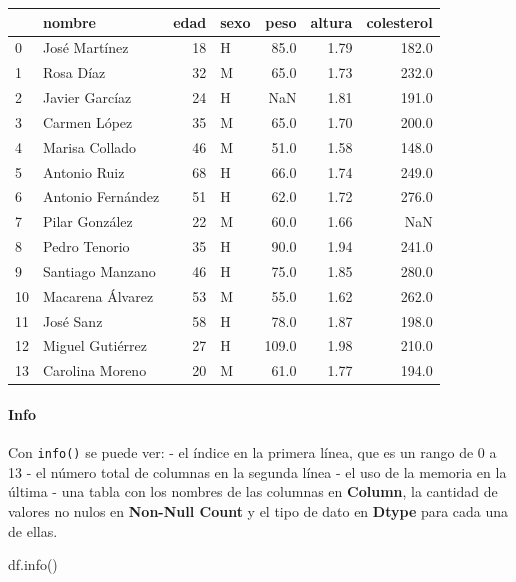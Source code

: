 \documentclass[
  letterpaper,
  DIV=11,
  numbers=noendperiod]{scrreprt}
\let\oldparagraph\paragraph
\renewcommand{\paragraph}[1]{\oldparagraph{#1}\mbox{}}
\newenvironment{Shaded}{\begin{snugshade}}{\end{snugshade}}
\newcommand{\NormalTok}[1]{\textcolor[rgb]{0.00,0.23,0.31}{#1}}
\begin{document}
\begin{tabular}{llrlrrr}
\toprule
{} &             nombre &  edad & sexo &   peso &  altura &  colesterol \\
\midrule
0  &      José Martínez &    18 &    H &   85.0 &    1.79 &       182.0 \\
1  &          Rosa Díaz &    32 &    M &   65.0 &    1.73 &       232.0 \\
2  &     Javier Garcíaz &    24 &    H &    NaN &    1.81 &       191.0 \\
3  &       Carmen López &    35 &    M &   65.0 &    1.70 &       200.0 \\
4  &     Marisa Collado &    46 &    M &   51.0 &    1.58 &       148.0 \\
5  &       Antonio Ruiz &    68 &    H &   66.0 &    1.74 &       249.0 \\
6  &  Antonio Fernández &    51 &    H &   62.0 &    1.72 &       276.0 \\
7  &     Pilar González &    22 &    M &   60.0 &    1.66 &         NaN \\
8  &      Pedro Tenorio &    35 &    H &   90.0 &    1.94 &       241.0 \\
9  &   Santiago Manzano &    46 &    H &   75.0 &    1.85 &       280.0 \\
10 &   Macarena Álvarez &    53 &    M &   55.0 &    1.62 &       262.0 \\
11 &          José Sanz &    58 &    H &   78.0 &    1.87 &       198.0 \\
12 &   Miguel Gutiérrez &    27 &    H &  109.0 &    1.98 &       210.0 \\
13 &    Carolina Moreno &    20 &    M &   61.0 &    1.77 &       194.0 \\
\bottomrule
\end{tabular}

\paragraph{Info}\label{info}

Con \texttt{info()} se puede ver: - el índice en la primera línea, que
es un rango de 0 a 13 - el número total de columnas en la segunda línea
- el uso de la memoria en la última - una tabla con los nombres de las
columnas en \textbf{Column}, la cantidad de valores no nulos en
\textbf{Non-Null Count} y el tipo de dato en \textbf{Dtype} para cada
una de ellas.

\begin{Shaded}
\begin{Highlighting}[]
\NormalTok{df.info()}
\end{Highlighting}
\end{Shaded}
\end{document}
